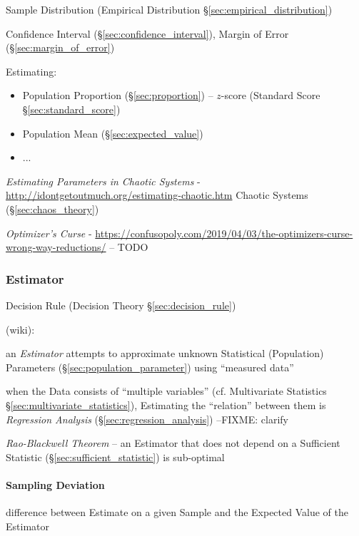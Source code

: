 Sample Distribution (Empirical Distribution \S\ref{sec:empirical_distribution})

Confidence Interval (\S\ref{sec:confidence_interval}), Margin of Error
(\S\ref{sec:margin_of_error})

Estimating:
\begin{itemize}
  \item Population Proportion (\S\ref{sec:proportion}) -- $z$-score (Standard
    Score \S\ref{sec:standard_score})
  \item Population Mean (\S\ref{sec:expected_value})
  \item ...
\end{itemize}

\emph{Estimating Parameters in Chaotic Systems} -
\url{http://idontgetoutmuch.org/estimating-chaotic.htm} \fist Chaotic Systems
(\S\ref{sec:chaos_theory})

\asterism

\emph{Optimizer's Curse} -
\url{https://confusopoly.com/2019/04/03/the-optimizers-curse-wrong-way-reductions/}
-- TODO



\subsubsection{Estimator}\label{sec:estimator}

\fist Decision Rule (Decision Theory \S\ref{sec:decision_rule})

(wiki):

an \emph{Estimator} attempts to approximate unknown Statistical (Population)
Parameters (\S\ref{sec:population_parameter}) using ``measured data''

when the Data consists of ``multiple variables'' (cf. Multivariate Statistics
\S\ref{sec:multivariate_statistics}), Estimating the ``relation'' between them
is \emph{Regression Analysis} (\S\ref{sec:regression_analysis})
--FIXME: clarify

\emph{Rao-Blackwell Theorem} -- an Estimator that does not depend on a
Sufficient Statistic (\S\ref{sec:sufficient_statistic}) is sub-optimal



\paragraph{Sampling Deviation}\label{sec:sampling_deviation}\hfill

difference between Estimate on a given Sample and the Expected Value of the
Estimator




